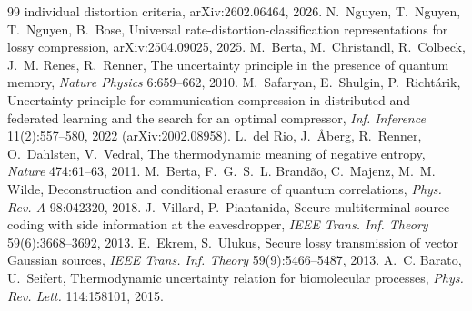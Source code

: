 \documentclass[11pt]{article}
\begin{document}
\begin{thebibliography}{99}
individual distortion criteria, arXiv:2602.06464, 2026.
 N.~Nguyen, T.~Nguyen, T.~Nguyen, B.~Bose, Universal
rate-distortion-classification representations for lossy compression,
arXiv:2504.09025, 2025.
 M.~Berta, M.~Christandl, R.~Colbeck, J.~M. Renes,
R.~Renner, The uncertainty principle in the presence of quantum memory,
\emph{Nature Physics} 6:659--662, 2010.
 M.~Safaryan, E.~Shulgin, P.~Richt\'arik, Uncertainty
principle for communication compression in distributed and federated
learning and the search for an optimal compressor, \emph{Inf. Inference}
11(2):557--580, 2022 (arXiv:2002.08958).
 L.~del Rio, J.~\r Aberg, R.~Renner, O.~Dahlsten,
V.~Vedral, The thermodynamic meaning of negative entropy, \emph{Nature}
474:61--63, 2011.
 M.~Berta, F.~G.~S.~L. Brand\~ao, C.~Majenz, M.~M. Wilde,
Deconstruction and conditional erasure of quantum correlations, \emph{Phys.
Rev. A} 98:042320, 2018.
 J.~Villard, P.~Piantanida, Secure multiterminal source
coding with side information at the eavesdropper, \emph{IEEE Trans. Inf.
Theory} 59(6):3668--3692, 2013.
 E.~Ekrem, S.~Ulukus, Secure lossy transmission of vector
Gaussian sources, \emph{IEEE Trans. Inf. Theory} 59(9):5466--5487, 2013.
 A.~C. Barato, U.~Seifert, Thermodynamic
uncertainty relation for biomolecular processes, \emph{Phys. Rev. Lett.}
114:158101, 2015.
\end{thebibliography}
\end{document}
